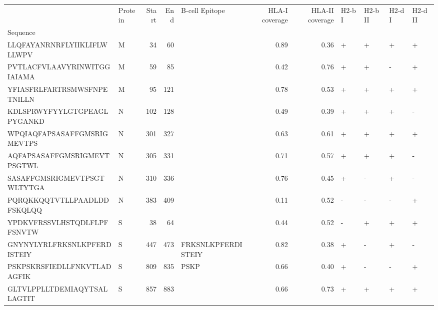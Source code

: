 \begin{tabular}{llrrlrrllll}
\toprule
{} & Protein &  Start &   End &      B-cell Epitope &  HLA-I coverage &  HLA-II coverage & H2-b I & H2-b II & H2-d I & H2-d II \\
Sequence                    &         &        &       &                     &                 &                  &        &         &        &         \\
\midrule
LLQFAYANRNRFLYIIKLIFLWLLWPV &       M &     34 &    60 &                     &            0.89 &             0.36 &      + &       + &      + &       + \\
PVTLACFVLAAVYRINWITGGIAIAMA &       M &     59 &    85 &                     &            0.42 &             0.76 &      + &       + &      - &       + \\
YFIASFRLFARTRSMWSFNPETNILLN &       M &     95 &   121 &                     &            0.78 &             0.53 &      + &       + &      + &       + \\
KDLSPRWYFYYLGTGPEAGLPYGANKD &       N &    102 &   128 &                     &            0.49 &             0.39 &      + &       + &      + &       - \\
WPQIAQFAPSASAFFGMSRIGMEVTPS &       N &    301 &   327 &                     &            0.63 &             0.61 &      + &       + &      + &       + \\
AQFAPSASAFFGMSRIGMEVTPSGTWL &       N &    305 &   331 &                     &            0.71 &             0.57 &      + &       + &      + &       - \\
SASAFFGMSRIGMEVTPSGTWLTYTGA &       N &    310 &   336 &                     &            0.76 &             0.45 &      + &       - &      + &       - \\
PQRQKKQQTVTLLPAADLDDFSKQLQQ &       N &    383 &   409 &                     &            0.11 &             0.52 &      - &       - &      - &       + \\
YPDKVFRSSVLHSTQDLFLPFFSNVTW &       S &     38 &    64 &                     &            0.44 &             0.52 &      - &       + &      + &       + \\
GNYNYLYRLFRKSNLKPFERDISTEIY &       S &    447 &   473 &  FRKSNLKPFERDISTEIY &            0.82 &             0.38 &      + &       - &      + &       - \\
PSKPSKRSFIEDLLFNKVTLADAGFIK &       S &    809 &   835 &                PSKP &            0.66 &             0.40 &      + &       - &      - &       + \\
GLTVLPPLLTDEMIAQYTSALLAGTIT &       S &    857 &   883 &                     &            0.66 &             0.73 &      + &       + &      + &       + \\

\end{tabular}
